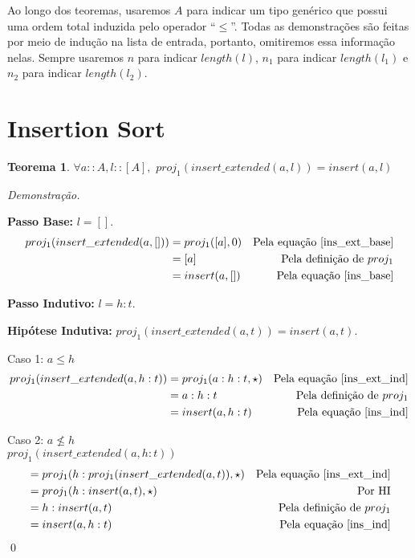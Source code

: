 \documentclass[12pt, oneside, a4paper,english,brazil]{abntex2}
\begin{document}
\qquad Ao longo dos teoremas, usaremos $A$ para indicar um tipo gen\'erico que possui uma ordem total induzida pelo
operador ``$\le$''. Todas as demonstra\c{c}\~oes s\~ao feitas por meio de indu\c{c}\~ao na lista de entrada,
portanto, omitiremos essa informa\c{c}\~ao nelas. Sempre usaremos $n$ para indicar $length(l)$, $n_{1}$ para indicar
$length(l_{1})$ e $n_{2}$ para indicar $length(l_{2})$.

\section{Insertion Sort}

\newtheorem{teorema}{Teorema}[section]

\begin{teorema} \label{insert_eq}
  $\forall a :: A, l :: [A], \,\, proj_1(insert\_extended(a, l)) = insert(a, l)$
\end{teorema}
\noindent \textit{Demonstra\c{c}\~ao.}

  \textbf{Passo Base: } $l = []$.
  \begin{align*}
    proj_{1}(insert\_extended(a, [])) &= proj_{1}([a], 0)  &\text{Pela equa\c{c}\~ao \ref{ins_ext_base}} \\
                                      &= [a] &\text{Pela defini\c{c}\~ao de } proj_{1} \\
    &= insert(a, [])  &\text{Pela equa\c{c}\~ao \ref{ins_base}}
  \end{align*}

  \textbf{Passo Indutivo: } $l = h : t$.

  \textbf{Hip\'otese Indutiva: } $proj_{1}(insert\_extended(a, t)) = insert(a, t)$.

  Caso 1: $a \le h$
    \begin{align*}
      proj_{1}(insert\_extended(a, h : t)) &= proj_{1}(a : h : t, \star) &\text{Pela equa\c{c}\~ao \ref{ins_ext_ind}} \\
      &= a : h : t &\text{Pela defini\c{c}\~ao de } proj_1 \\
      &= insert(a, h : t) &\text{Pela equa\c{c}\~ao \ref{ins_ind}}
    \end{align*}
    \newpage

    Caso 2: $a \not\le h$ \\

      $proj_{1}(insert\_extended(a, h : t))$
    \begin{align*}
       &=  proj_{1}(h : proj_{1}(insert\_extended(a, t)), \star) &\text{Pela equa\c{c}\~ao \ref{ins_ext_ind}}\\
       &= proj_{1}(h : insert(a, t), \star) &\text{Por HI} \\
       &= h : insert(a, t) &\text{Pela defini\c{c}\~ao de $proj_{1}$} \\
      &= insert(a, h : t) &\text{Pela equa\c{c}\~ao \ref{ins_ind}}
    \end{align*}
\qed
\end{document}
